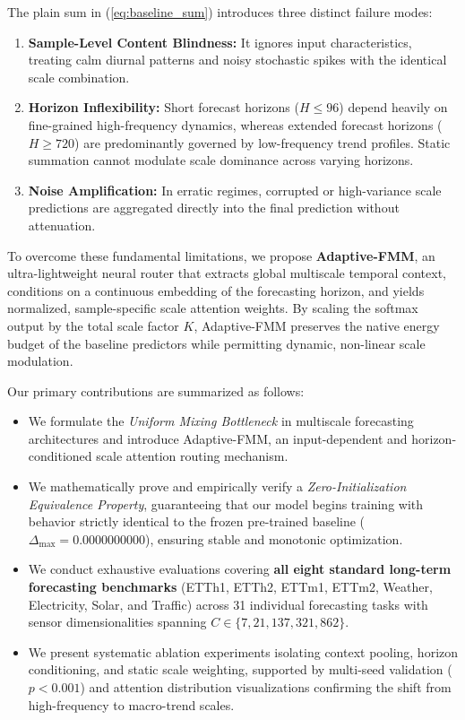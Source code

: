 \documentclass[journal]{IEEEtran}
\begin{document}
The plain sum in (\ref{eq:baseline_sum}) introduces three distinct failure modes:
\begin{enumerate}
\item \textbf{Sample-Level Content Blindness:} It ignores input characteristics, treating calm diurnal patterns and noisy stochastic spikes with the identical scale combination.
\item \textbf{Horizon Inflexibility:} Short forecast horizons ($H \le 96$) depend heavily on fine-grained high-frequency dynamics, whereas extended forecast horizons ($H \ge 720$) are predominantly governed by low-frequency trend profiles. Static summation cannot modulate scale dominance across varying horizons.
\item \textbf{Noise Amplification:} In erratic regimes, corrupted or high-variance scale predictions are aggregated directly into the final prediction without attenuation.
\end{enumerate}

To overcome these fundamental limitations, we propose \textbf{Adaptive-FMM}, an ultra-lightweight neural router that extracts global multiscale temporal context, conditions on a continuous embedding of the forecasting horizon, and yields normalized, sample-specific scale attention weights. By scaling the softmax output by the total scale factor $K$, Adaptive-FMM preserves the native energy budget of the baseline predictors while permitting dynamic, non-linear scale modulation.

Our primary contributions are summarized as follows:
\begin{itemize}
\item We formulate the \textit{Uniform Mixing Bottleneck} in multiscale forecasting architectures and introduce Adaptive-FMM, an input-dependent and horizon-conditioned scale attention routing mechanism.
\item We mathematically prove and empirically verify a \textit{Zero-Initialization Equivalence Property}, guaranteeing that our model begins training with behavior strictly identical to the frozen pre-trained baseline ($\Delta_{\max} = 0.0000000000$), ensuring stable and monotonic optimization.
\item We conduct exhaustive evaluations covering \textbf{all eight standard long-term forecasting benchmarks} (ETTh1, ETTh2, ETTm1, ETTm2, Weather, Electricity, Solar, and Traffic) across 31 individual forecasting tasks with sensor dimensionalities spanning $C \in \{7, 21, 137, 321, 862\}$.
\item We present systematic ablation experiments isolating context pooling, horizon conditioning, and static scale weighting, supported by multi-seed validation ($p < 0.001$) and attention distribution visualizations confirming the shift from high-frequency to macro-trend scales.
\end{itemize}
\end{document}
